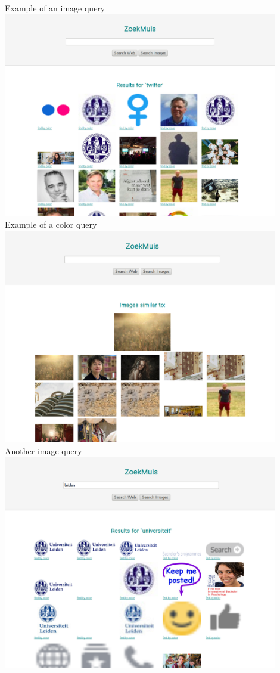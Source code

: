 \documentclass[10pt,a4paper]{article}
\begin{document}
Example of an image query \newline
\includegraphics[width=12cm]{zoekmuis_images.png}\newline
\newpage
Example of a color query\newline
\includegraphics[width=12cm]{zoekmuis_color.png}\newline
Another image query\newline
\includegraphics[width=12cm]{zoekmuis_images2.png}\newline
\end{document}
